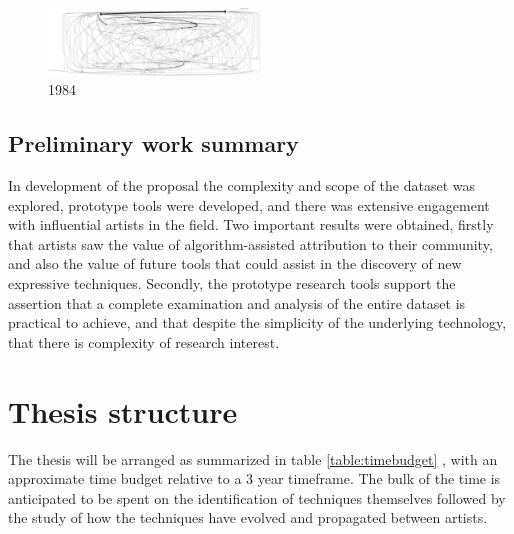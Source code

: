 \documentclass[10pt]{article}
\begin{document}
\begin{multicols*}{2}
\begin{figure}[H]
\includegraphics[width=0.5\textwidth]{1984}
\caption{1984}
\end{figure}

\subsection{Preliminary work summary}

In development of the proposal the complexity and scope of the dataset was explored, prototype tools were developed, and there was extensive engagement with influential artists in the field. Two important results were obtained, firstly that artists saw the value of algorithm-assisted attribution to their community, and also the value of future tools that could assist in the discovery of new expressive techniques. Secondly, the prototype research tools support the assertion that a complete examination and analysis of the entire dataset is practical to achieve, and that despite the simplicity of the underlying technology, that there is complexity of research interest.

\section{Thesis structure}

The thesis will be arranged as summarized in table \ref{table:timebudget} , with an approximate time budget relative to a 3 year timeframe. The bulk of the time is anticipated to be spent on the identification of techniques themselves followed by the study of how the techniques have evolved and propagated between artists.


\end{multicols*}
\end{document}
